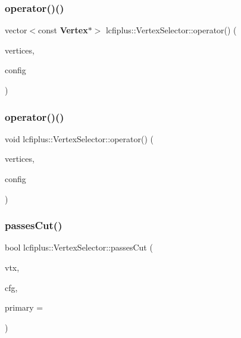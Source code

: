 \mbox{\label{classlcfiplus_1_1VertexSelector_a0981a6da2cd91651eae47b8ff2b27835}} 
\subsubsection{operator()()\hspace{0.1cm}{\footnotesize\ttfamily [3/4]}}
{\footnotesize\ttfamily vector$<$const \textbf{ Vertex}$\ast$$>$ lcfiplus\+::\+Vertex\+Selector\+::operator() (\begin{DoxyParamCaption}\item[{\textbf{ Vertex\+Vec} \&}]{vertices,  }\item[{\textbf{ Vertex\+Selector\+Config} \&}]{config }\end{DoxyParamCaption})\hspace{0.3cm}{\ttfamily [inline]}}

\mbox{\label{classlcfiplus_1_1VertexSelector_a75b880ae4281adbe6d217085485b5a49}} 
\subsubsection{operator()()\hspace{0.1cm}{\footnotesize\ttfamily [4/4]}}
{\footnotesize\ttfamily void lcfiplus\+::\+Vertex\+Selector\+::operator() (\begin{DoxyParamCaption}\item[{vector$<$ \textbf{ Vertex} $\ast$$>$ \&}]{vertices,  }\item[{\textbf{ Vertex\+Selector\+Config} \&}]{config }\end{DoxyParamCaption})\hspace{0.3cm}{\ttfamily [inline]}}

\mbox{\label{classlcfiplus_1_1VertexSelector_a44bb96d74ba3b339cf73ddacd557a4b9}} 
\subsubsection{passes\+Cut()}
{\footnotesize\ttfamily bool lcfiplus\+::\+Vertex\+Selector\+::passes\+Cut (\begin{DoxyParamCaption}\item[{const \textbf{ Vertex} $\ast$}]{vtx,  }\item[{const \textbf{ Vertex\+Selector\+Config} \&}]{cfg,  }\item[{const \textbf{ Vertex} $\ast$}]{primary = {} }\end{DoxyParamCaption})\hspace{0.3cm}{\ttfamily [inline]}}



